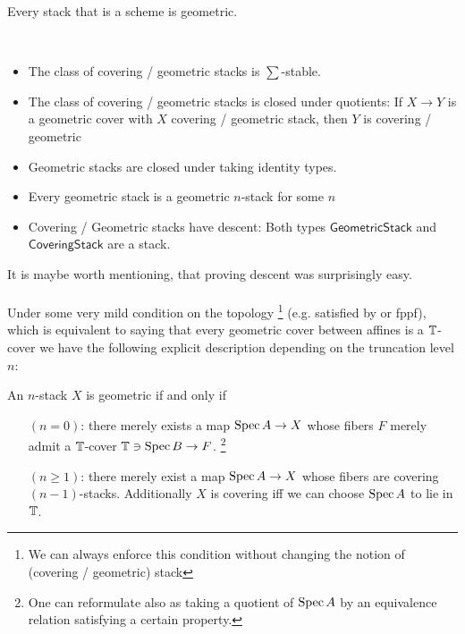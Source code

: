 \documentclass{article}
\begin{document}
	\begin{example}
		Every stack that is a scheme is geometric. 
	\end{example}
	
	\begin{theorem}
		\ \begin{itemize}
			\item The class of covering / geometric stacks is $\sum$-stable. %
			\item The class of covering / geometric stacks is closed under quotients: If $X \to Y$ is a geometric cover with $X$ covering / geometric stack, then $Y$ is covering / geometric
			\item   Geometric stacks are closed under taking identity types.
			\item Every geometric stack is a geometric $n$-stack for some $n$
			\item Covering / Geometric stacks have descent: Both types $\mathsf{GeometricStack}$ and $\mathsf{CoveringStack}$ are a stack.
		\end{itemize}
	\end{theorem}
	It is maybe worth mentioning, that proving descent was surprisingly easy. \\ \\
	Under some very mild condition on the topology \footnote{We can always enforce this condition without changing the notion of (covering / geometric) stack}  (e.g. satisfied by \etale or fppf), which is equivalent to saying that every geometric cover between affines is a $\mathbb{T}$-cover we have the following explicit description depending on the truncation level $n$:
	\begin{theorem}
		An $n$-stack $X$ is geometric if and only if 
		\begin{itemize}
			\item [$(n=0)$:]
			there merely exists a map $\operatorname{Spec} A \to X$ whose fibers $F$ merely admit a $\mathbb{T}$-cover $\mathbb{T} \ni \operatorname{Spec} B \to F$. \footnote{One can reformulate also as taking a quotient of $\operatorname{Spec} A$ by an equivalence relation satisfying a certain property.}
			\item [$(n \ge 1)$:]
			there merely exist a map $\operatorname{Spec} A \to X$ whose fibers are covering $(n-1)$-stacks. Additionally $X$ is covering iff we can choose $\operatorname{Spec} A$ to lie in $\mathbb{T}$.
		\end{itemize}
	\end{theorem}
	
\end{document}
